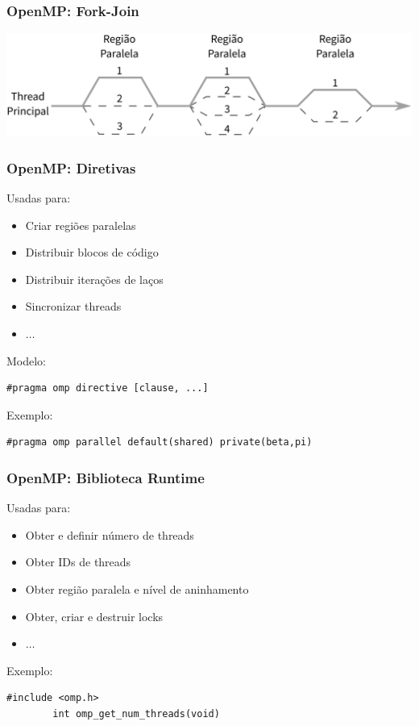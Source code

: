 \documentclass[10pt, compress]{beamer}
\begin{document}
\begin{frame}
    \frametitle{OpenMP: Fork-Join}
    \begin{center}
        \includegraphics[width=\textwidth]{omp-fork-join}
    \end{center}
\end{frame}

\begin{frame}[fragile]
    \frametitle{OpenMP: Diretivas}
    Usadas para:
    \begin{itemize}
        \item Criar \alert{regiões paralelas}
        \item Distribuir \alert{blocos de código}
        \item Distribuir \alert{iterações de laços}
        \item \alert{Sincronizar threads}
        \item $\dots$
    \end{itemize}

    Modelo:
    \begin{lstlisting}[basicstyle=\ttfamily\scriptsize]
        #pragma omp directive [clause, ...]
    \end{lstlisting}

    Exemplo:
    \begin{lstlisting}[basicstyle=\ttfamily\scriptsize]
        #pragma omp parallel default(shared) private(beta,pi)
    \end{lstlisting}
\end{frame}

\begin{frame}[fragile]
    \frametitle{OpenMP: Biblioteca Runtime}
    Usadas para:
    \begin{itemize}
        \item Obter e definir \alert{número de threads}
        \item Obter \alert{IDs de threads}
        \item Obter \alert{região paralela e nível de aninhamento}
        \item Obter, criar e destruir \alert{locks}
        \item $\dots$
    \end{itemize}

    Exemplo:
    \begin{lstlisting}[basicstyle=\ttfamily\scriptsize]
        #include <omp.h>
        int omp_get_num_threads(void)
    \end{lstlisting}
\end{frame}
\end{document}
